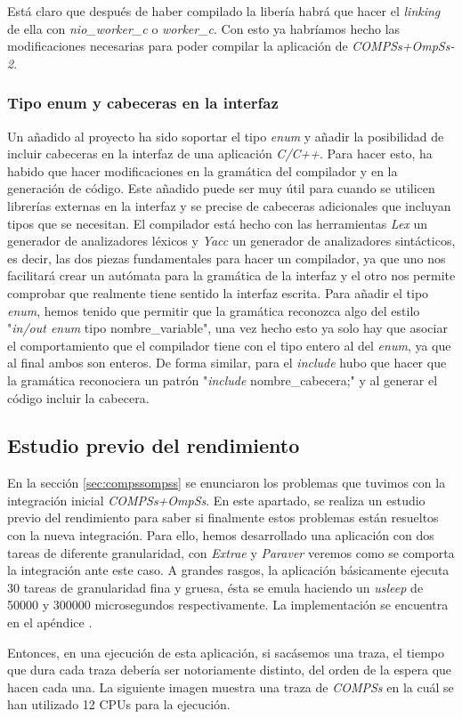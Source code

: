 Está claro que después de haber compilado la libería habrá que hacer el \textit{linking} de ella con \textit{nio\_worker\_c} o \textit{worker\_c}. Con esto ya habríamos hecho las modificaciones necesarias para poder compilar la aplicación de \textit{COMPSs+OmpSs-2}.

\subsubsection{Tipo enum y cabeceras en la interfaz}


Un añadido al proyecto ha sido soportar el tipo \textit{enum} y añadir la posibilidad de incluir cabeceras en la interfaz de una aplicación \textit{C/C++}. Para hacer esto, ha habido que hacer modificaciones en la gramática del compilador y en la generación de código. Este añadido puede ser muy útil para cuando se utilicen librerías externas en la interfaz y se precise de cabeceras adicionales que incluyan tipos que se necesitan.
\bigskip
El compilador está hecho con las herramientas \textit{Lex} un generador de analizadores léxicos y \textit{Yacc} un generador de analizadores sintácticos, es decir, las dos piezas fundamentales para hacer un compilador, ya que uno nos facilitará crear un autómata para la gramática de la interfaz y el otro nos permite comprobar que realmente tiene sentido la interfaz escrita.
\bigskip
Para añadir el tipo \textit{enum}, hemos tenido que permitir que la gramática reconozca algo del estilo "\textit{in/out enum} tipo nombre\_variable", una vez hecho esto ya solo hay que asociar el comportamiento que el compilador tiene con el tipo entero al del \textit{enum}, ya que al final ambos son enteros. De forma similar, para el \textit{include} hubo que hacer que la gramática reconociera un patrón "\textit{include} nombre\_cabecera;" y al generar el código incluir la cabecera.


\subsection{Estudio previo del rendimiento}

En la sección \ref{sec:compssompss} se enunciaron los problemas que tuvimos con la integración inicial \textit{COMPSs+OmpSs}. En este apartado, se realiza un estudio previo del rendimiento para saber si finalmente estos problemas están resueltos con la nueva integración. Para ello, hemos desarrollado una aplicación con dos tareas de diferente granularidad, con \textit{Extrae} y \textit{Paraver} veremos como se comporta la integración ante este caso. A grandes rasgos, la aplicación básicamente ejecuta 30 tareas de granularidad fina y gruesa, ésta se emula haciendo un \textit{usleep} de 50000 y 300000 microsegundos respectivamente. La implementación se encuentra en el apéndice .
\par\bigskip
Entonces, en una ejecución de esta aplicación, si sacásemos una traza, el tiempo que dura cada traza debería ser notoriamente distinto, del orden de la espera que hacen cada una. La siguiente imagen muestra una traza de \textit{COMPSs} en la cuál se han utilizado 12 CPUs para la ejecución.

